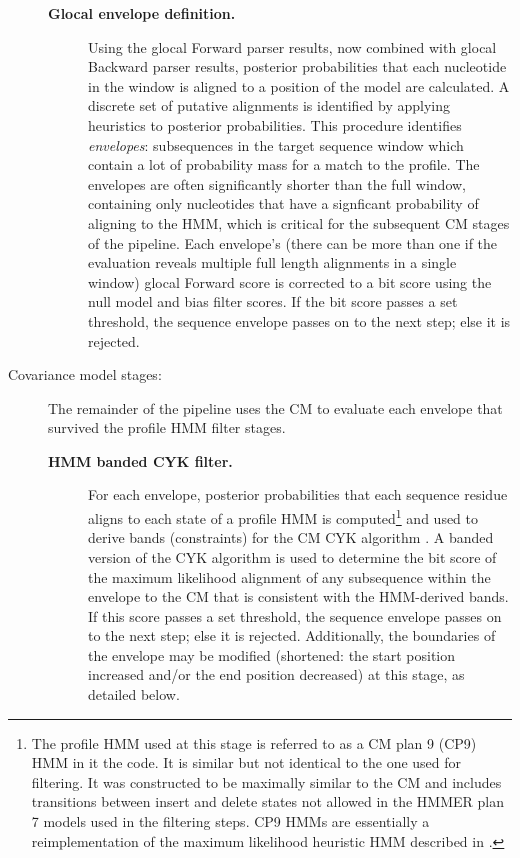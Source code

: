 \begin{description}
\begin{description}
\item[\textbf{Glocal envelope definition.}] Using the glocal Forward
  parser results, now combined with glocal Backward parser results,
  posterior probabilities that each nucleotide in the window is aligned
  to a position of the model are calculated. A discrete set of
  putative alignments is identified by applying heuristics to
  posterior probabilities. This procedure identifies \emph{envelopes}:
  subsequences in the target sequence window which contain a lot of
  probability mass for a match to the profile. The envelopes are often
  significantly shorter than the full window, containing only nucleotides
  that have a signficant probability of aligning to the HMM, which is
  critical for the subsequent CM stages of the pipeline. Each
  envelope's (there can be more than one if the evaluation reveals
  multiple full length alignments in a single window) glocal Forward
  score is corrected to a bit score using the null model and bias
  filter scores. If the bit score passes a set threshold, the sequence
  envelope passes on to the next step; else it is rejected.

\end{description}

\item[Covariance model stages:] The remainder of the pipeline uses the
  CM to evaluate each envelope that survived the profile HMM filter
  stages. 

\begin{description}
\item[\textbf{HMM banded CYK filter.}] For each envelope, posterior
  probabilities that each sequence residue aligns to each state of a
  profile HMM is computed\footnote{The profile HMM used at this stage
  is referred to as a CM plan 9 (CP9) HMM in it the code. It is
  similar but not identical to the one used for filtering. It was
  constructed to be maximally similar to the CM and includes
  transitions between insert and delete states not allowed in the
  HMMER plan 7 models used in the filtering steps. CP9 HMMs are
  essentially a reimplementation of the maximum likelihood heuristic
  HMM described in \citep{WeinbergRuzzo06}.} and used to derive bands
  (constraints) for the CM CYK algorithm \citep{Brown00,
  Nawrocki09b}. A banded version of the CYK algorithm is used to
  determine the bit score of the maximum likelihood alignment of any
  subsequence within the envelope to the CM that is consistent with
  the HMM-derived bands. If this score passes a set threshold, the
  sequence envelope passes on to the next step; else it is rejected. 
  Additionally, the boundaries of the envelope may be modified
  (shortened: the start position increased and/or the end position
  decreased) at this stage, as detailed below.


\end{description}
\end{description}
